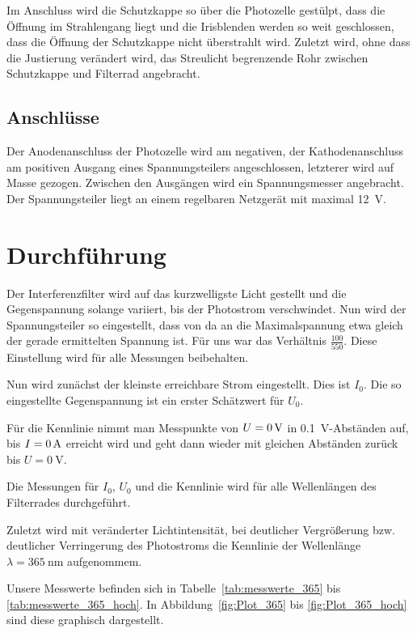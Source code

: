 Im Anschluss wird die Schutzkappe so über die Photozelle gestülpt, dass
die Öffnung im Strahlengang liegt und die Irisblenden werden so weit
geschlossen, dass die Öffnung der Schutzkappe nicht überstrahlt wird.
Zuletzt wird, ohne dass die Justierung verändert wird, das Streulicht
begrenzende Rohr zwischen Schutzkappe und Filterrad angebracht.

\FloatBarrier
\subsection{Anschlüsse}

Der Anodenanschluss der Photozelle wird am negativen, der Kathodenanschluss am
positiven Ausgang eines Spannungsteilers angeschlossen, letzterer wird auf
Masse gezogen. Zwischen den Ausgängen wird ein Spannungsmesser angebracht. Der
Spannungsteiler liegt an einem regelbaren Netzgerät mit maximal \SI{12}{\volt}.

\FloatBarrier
\section{Durchführung}

Der Interferenzfilter wird auf das kurzwelligste Licht gestellt und die
Gegenspannung solange variiert, bis der Photostrom verschwindet. Nun wird der
Spannungsteiler so eingestellt, dass von da an die Maximalspannung etwa gleich
der gerade ermittelten Spannung ist. Für uns war das Verhältnis
$\frac{100}{550}$. Diese Einstellung wird für alle Messungen
beibehalten.

Nun wird zunächst der kleinste erreichbare Strom eingestellt. Dies ist $I_0$.
Die so eingestellte Gegenspannung ist ein erster Schätzwert für $U_0$.

Für die Kennlinie nimmt man Messpunkte von $U = \SI0{\volt}$ in
\SI{0.1}{\volt}-Abständen auf, bis $I = \SI0{\ampere}$ erreicht wird und geht
dann wieder mit gleichen Abständen zurück bis $U = \SI{0}{\volt}$.

Die Messungen für $I_0$, $U_0$ und die Kennlinie wird für alle Wellenlängen des
Filterrades durchgeführt.

Zuletzt wird mit veränderter Lichtintensität, bei deutlicher Vergrößerung bzw.
deutlicher Verringerung des Photostroms die Kennlinie der Wellenlänge $\lambda
= \SI{365}{\nano\meter}$ aufgenommem.

Unsere Messwerte befinden sich in Tabelle~\ref{tab:messwerte_365} bis
\ref{tab:messwerte_365_hoch}. In Abbildung~\ref{fig:Plot_365} bis
\ref{fig:Plot_365_hoch} sind diese graphisch dargestellt.

